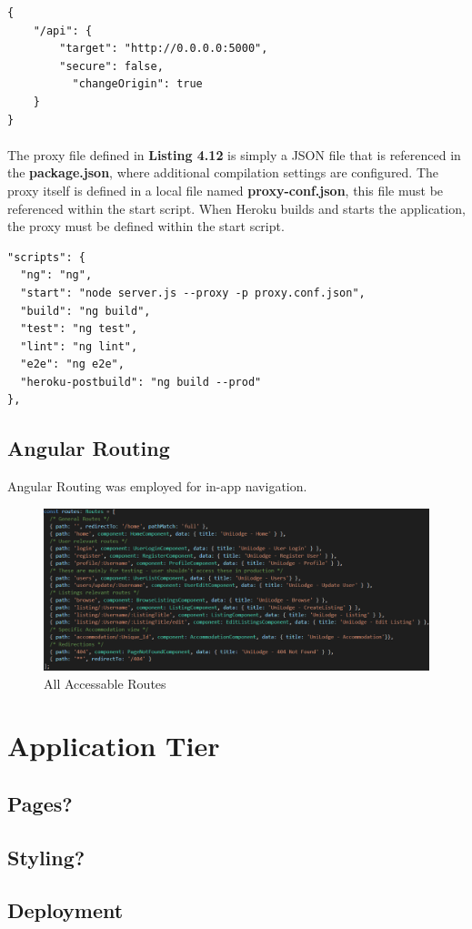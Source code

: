 \begin{lstlisting}[caption=API Proxy]
{
    "/api": {
        "target": "http://0.0.0.0:5000",
        "secure": false, 
    	  "changeOrigin": true
    }
}
\end{lstlisting}

\paragraph{}
The proxy file defined in \textbf{Listing 4.12} is simply a JSON file that is referenced in the \textbf{package.json}, where additional compilation settings are configured. The proxy itself is defined in a local file named \textbf{proxy-conf.json}, this file must be referenced within the start script. When Heroku builds and starts the application, the proxy must be defined within the start script. 

\begin{lstlisting}[caption=Proxy Reference]
"scripts": {
  "ng": "ng",
  "start": "node server.js --proxy -p proxy.conf.json",
  "build": "ng build",
  "test": "ng test",
  "lint": "ng lint",
  "e2e": "ng e2e",
  "heroku-postbuild": "ng build --prod"
},
\end{lstlisting}

\subsection{Angular Routing}
Angular Routing was employed for in-app navigation. 

\begin{figure}[H]
	\caption{All Accessable Routes}
	\label{image:routing}
	\centering
	\includegraphics[width=1\textwidth]{images/routes.png}
\end{figure}	


\section{Application Tier}
\subsection{Pages?}
\subsection{Styling?}
\subsection{Deployment}